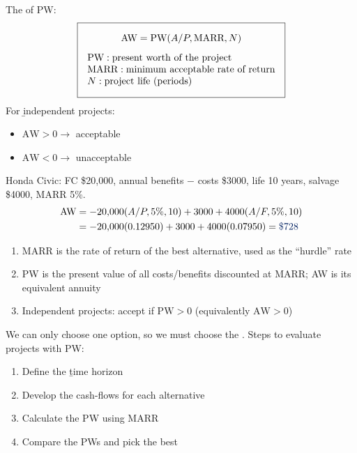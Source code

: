 \begin{definition}
    The  of PW:
    \[\boxed{\begin{gathered}
        \text{AW} = \text{PW}(A/P,\text{MARR},N)\\[4pt]
        \begin{array}{@{}l@{}}
            \text{PW}: \text{present worth of the project}\\
            \text{MARR}: \text{minimum acceptable rate of return}\\
            N: \text{project life (periods)}
        \end{array}
    \end{gathered}}\]
    For \b{independent} projects:
    \begin{itemize}
        \item $\text{AW} > 0 \to$ acceptable
        \item $\text{AW} < 0 \to$ unacceptable
    \end{itemize}
\end{definition}

\begin{example}
    Honda Civic: FC \$20,000, annual benefits $-$ costs \$3000, life 10
    years, salvage \$4000, MARR 5\%.
    \\
    \begin{align*}
        \text{AW} &= -20{,}000(A/P,5\%,10) + 3000 + 4000(A/F,5\%,10)\\
        &= -20{,}000(0.12950) + 3000 + 4000(0.07950) = \db{\$728}
    \end{align*}
\end{example}

\begin{enumerate}
    \item MARR is the rate of return of the best alternative, used as the ``hurdle'' rate
    \item PW is the present value of all costs/benefits discounted at MARR; AW is its equivalent annuity
    \item Independent projects: accept if $\text{PW} > 0$ (equivalently $\text{AW} > 0$)
\end{enumerate}


We can only choose one option, so we must choose the . Steps to
evaluate projects with PW:
\begin{enumerate}
    \item Define the \b{time horizon}
    \item Develop the cash-flows for each alternative
    \item Calculate the PW using MARR
    \item Compare the PWs and pick the best
\end{enumerate}

